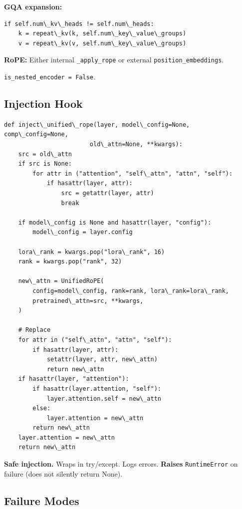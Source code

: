 \textbf{GQA expansion:}
\begin{lstlisting}
if self.num\_kv\_heads != self.num\_heads:
    k = repeat\_kv(k, self.num\_key\_value\_groups)
    v = repeat\_kv(v, self.num\_key\_value\_groups)
\end{lstlisting}

\textbf{RoPE:} Either internal \texttt{\_apply\_rope} or external \texttt{position\_embeddings}.

\texttt{is\_nested\_encoder = False}.

\subsection{Injection Hook}

\begin{lstlisting}
def inject\_unified\_rope(layer, model\_config=None, comp\_config=None,
                        old\_attn=None, **kwargs):
    src = old\_attn
    if src is None:
        for attr in ("attention", "self\_attn", "attn", "self"):
            if hasattr(layer, attr):
                src = getattr(layer, attr)
                break
    
    if model\_config is None and hasattr(layer, "config"):
        model\_config = layer.config
    
    lora\_rank = kwargs.pop("lora\_rank", 16)
    rank = kwargs.pop("rank", 32)
    
    new\_attn = UnifiedRoPE(
        config=model\_config, rank=rank, lora\_rank=lora\_rank,
        pretrained\_attn=src, **kwargs,
    )
    
    # Replace
    for attr in ("self\_attn", "attn", "self"):
        if hasattr(layer, attr):
            setattr(layer, attr, new\_attn)
            return new\_attn
    if hasattr(layer, "attention"):
        if hasattr(layer.attention, "self"):
            layer.attention.self = new\_attn
        else:
            layer.attention = new\_attn
        return new\_attn
    layer.attention = new\_attn
    return new\_attn
\end{lstlisting}

\textbf{Safe injection.} Wraps in try/except. Logs errors. \textbf{Raises} 
\texttt{RuntimeError} on failure (does not silently return None).

\subsection{Failure Modes}

